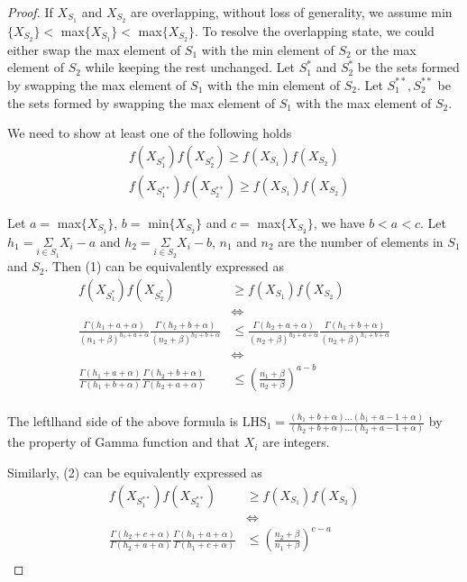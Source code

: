 \documentclass[aoas,preprint]{imsart}
\begin{document}
\begin{proof}
If $X_{S_1}$ and $X_{S_2}$ are overlapping, without loss of generality, we assume min$\{X_{S_2}\}  <$ max$\{X_{S_1}\}  <$ max$\{X_{S_2}\}$. To resolve the overlapping state, we could either
swap the max element of $S_1$ with the min element of $S_2$ or the max element of $S_2$ while keeping the rest unchanged. 
Let $S_1^*$ and $S_2^*$ be the sets formed by swapping the max element of $S_1$ with the min element of $S_2$. 
Let $S_1^{**}, S_2^{**}$ be the sets formed by swapping the max element of $S_1$ with the max element of $S_2$.

We need to show  at least one of the following holds
\begin{align}
&f(X_{S_1^*}) f(X_{S_2^*}) \geq f(X_{S_1}) f(X_{S_2})\\
&f(X_{S_1^{**}}) f(X_{S_2^{**}}) \geq f(X_{S_1}) f(X_{S_2})
\end{align}


Let $a =$ max$\{X_{S_1}\}$, $b = $ min$\{X_{S_2}\}$ and $c = $ max$\{X_{S_2}\}$, we have $b < a < c$. Let $h_1 = \underset{i \in S_1}{\Sigma} X_i - a$ and $h_2 = \underset{i \in S_2}{\Sigma} X_i - b$, $n_1$ and $n_2$ are the number of elements in $S_1$ and $S_2$. Then (1) can be equivalently expressed as 
\begin{align*}
f(X_{S_1^*}) f(X_{S_2^*}) &\geq f(X_{S_1}) f(X_{S_2})\\
&\iff\\
\frac{\Gamma(h_1 + a + \alpha)}{(n_1 + \beta)^{h_1 + a +\alpha}} \frac{\Gamma(h_2 + b + \alpha)}{(n_2 + \beta)^{h_2 + b + \alpha}} &\leq \frac{\Gamma(h_2 + a + \alpha)}{(n_2 + \beta)^{h_2+ a +\alpha}} \frac{\Gamma(h_1 + b + \alpha)}{(n_2 + \beta)^{h_1 + b + \alpha}}\\
&\iff\\
\frac{\Gamma(h_1 + a + \alpha)}{\Gamma(h_1 + b + \alpha)} \frac{\Gamma(h_2 + b + \alpha)}{\Gamma(h_2 + a + \alpha)} &\leq \left(\frac{n_1 + \beta}{n_2 + \beta}\right)^{a - b} \\
\end{align*}

The leftlhand side of the above formula is $\text{LHS}_1 = \frac{(h_1 + b + \alpha)...(h_1 + a - 1 + \alpha)}{(h_2 + b + \alpha) ... (h_2 + a - 1 + \alpha)}$ by the property of Gamma function and that 
 $X_i$ are integers.

Similarly, (2) can be equivalently expressed as 
\begin{align*}
f(X_{S_1^{**}}) f(X_{S_2^{**}}) &\geq f(X_{S_1}) f(X_{S_2})\\
&\iff\\
\frac{\Gamma(h_2 + c + \alpha)}{\Gamma(h_2 + a + \alpha)} \frac{\Gamma(h_1 + a + \alpha)}{\Gamma(h_1 + c + \alpha)} &\leq \left(\frac{n_2 + \beta}{n_1 + \beta}\right)^{c - a} \\
\end{align*}


\end{proof}
\end{document}
